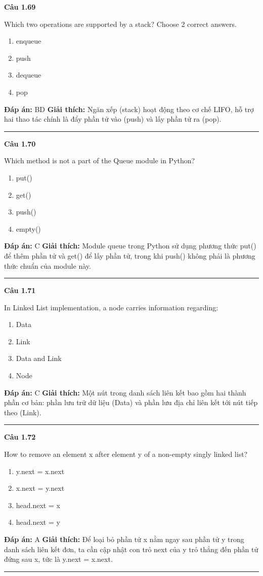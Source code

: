 \documentclass[11pt,a4paper]{article}
\newenvironment{question}[1]{%
  \par\vspace{1em}\noindent\textbf{\large Câu #1}\par\vspace{0.4em}
}{%
  \par\vspace{1em}\hrule\vspace{0.6em}
}
\newenvironment{choices}{%
  \begin{enumerate}[label=\textbf{\Alph*.},leftmargin=2.2em,itemsep=2pt,topsep=3pt]
}{%
  \end{enumerate}
}
\newcommand{\choice}{\item}
\begin{document}
\begin{question}{1.69}
Which two operations are supported by a stack? Choose 2 correct answers.
\begin{choices}
\choice enqueue
\choice push
\choice dequeue
\choice pop
\end{choices}
\textbf{Đáp án:} BD
\textbf{Giải thích:} Ngăn xếp (stack) hoạt động theo cơ chế LIFO, hỗ trợ hai thao tác chính là đẩy phần tử vào (push) và lấy phần tử ra (pop).
\end{question}

\begin{question}{1.70}
Which method is not a part of the Queue module in Python?
\begin{choices}
\choice put()
\choice get()
\choice push()
\choice empty()
\end{choices}
\textbf{Đáp án:} C
\textbf{Giải thích:} Module queue trong Python sử dụng phương thức put() để thêm phần tử và get() để lấy phần tử, trong khi push() không phải là phương thức chuẩn của module này.
\end{question}

\begin{question}{1.71}
In Linked List implementation, a node carries information regarding:
\begin{choices}
\choice Data
\choice Link
\choice Data and Link
\choice Node
\end{choices}
\textbf{Đáp án:} C
\textbf{Giải thích:} Một nút trong danh sách liên kết bao gồm hai thành phần cơ bản: phần lưu trữ dữ liệu (Data) và phần lưu địa chỉ liên kết tới nút tiếp theo (Link).
\end{question}

\begin{question}{1.72}
How to remove an element x after element y of a non-empty singly linked list?
\begin{choices}
\choice y.next = x.next
\choice x.next = y.next
\choice head.next = x
\choice head.next = y
\end{choices}
\textbf{Đáp án:} A
\textbf{Giải thích:} Để loại bỏ phần tử x nằm ngay sau phần tử y trong danh sách liên kết đơn, ta cần cập nhật con trỏ next của y trỏ thẳng đến phần tử đứng sau x, tức là y.next = x.next.
\end{question}
\end{document}
